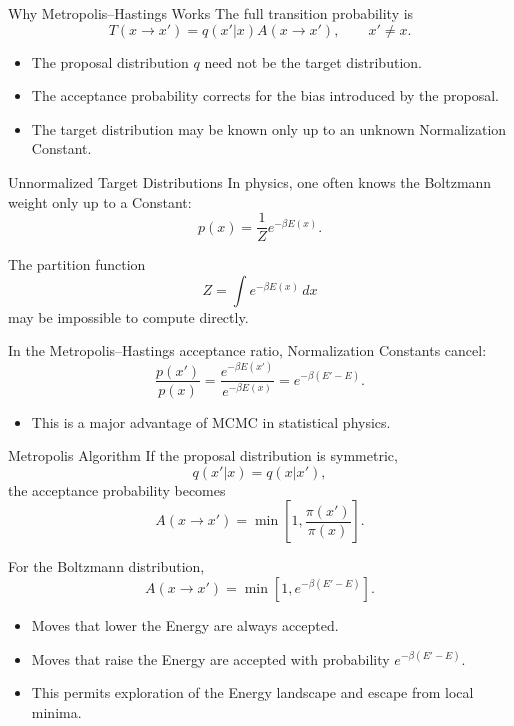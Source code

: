 \documentclass[a4paper, 10pt, onepage]{elegantbook}
\begin{document}
{\begin{frame}{Why Metropolis--Hastings Works}
  The full transition probability is
  \[
    T(x\to x')
    =
    q(x'|x)A(x\to x'),
    \qquad x'\ne x.
  \]

  \begin{itemize}
    \item The proposal distribution \(q\) need not be the target distribution.
    \item The acceptance probability corrects for the bias introduced by the proposal.
    \item The target distribution may be known only up to an unknown Normalization Constant.
  \end{itemize}
\end{frame}

\begin{frame}{Unnormalized Target Distributions}
  In physics, one often knows the Boltzmann weight only up to a Constant:
  \[
    p(x)
    =
    \frac{1}{Z}e^{-\beta E(x)}.
  \]

  The partition function
  \[
    Z=\int e^{-\beta E(x)}\,dx
  \]
  may be impossible to compute directly.

  In the Metropolis--Hastings acceptance ratio, Normalization Constants cancel:
  \[
    \frac{p(x')}{p(x)}
    =
    \frac{e^{-\beta E(x')}}{e^{-\beta E(x)}}
    =
    e^{-\beta(E'-E)}.
  \]

  \begin{itemize}
    \item This is a major advantage of MCMC in statistical physics.
  \end{itemize}
\end{frame}

\begin{frame}{Metropolis Algorithm}
  If the proposal distribution is symmetric,
  \[
    q(x'|x)=q(x|x'),
  \]
  the acceptance probability becomes
  \[
    A(x\to x')
    =
    \min\left[
      1,
      \frac{\pi(x')}{\pi(x)}
    \right].
  \]

  For the Boltzmann distribution,
  \[
    A(x\to x')
    =
    \min\left[
      1,
      e^{-\beta(E'-E)}
    \right].
  \]

  \begin{itemize}
    \item Moves that lower the Energy are always accepted.
    \item Moves that raise the Energy are accepted with probability \(e^{-\beta(E'-E)}\).
    \item This permits exploration of the Energy landscape and escape from local minima.
  \end{itemize}
\end{frame}

}
\end{document}
